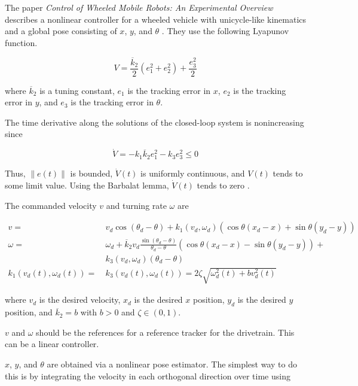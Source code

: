 The paper \textit{Control of Wheeled Mobile Robots: An Experimental Overview}
describes a nonlinear controller for a wheeled vehicle with unicycle-like
kinematics and a global pose consisting of $x$, $y$, and $\theta$
\cite{bib:ctrl-wheeled-mobile-robots}. They use the following Lyapunov function.

\begin{equation*}
  V = \frac{\overline{k}_2}{2}(e_1^2 + e_2^2) + \frac{e_3^2}{2}
\end{equation*}

where $\overline{k}_2$ is a tuning constant, $e_1$ is the tracking error in $x$,
$e_2$ is the tracking error in $y$, and $e_3$ is the tracking error in $\theta$.

The time derivative along the solutions of the closed-loop system is
nonincreasing since

\begin{equation*}
  \dot{V} = -k_1 \overline{k}_2 e_1^2 - k_3 e_3^2 \leq 0
\end{equation*}

Thus, $\lVert e(t) \rVert$ is bounded, $\dot{V}(t)$ is uniformly continuous,
and $V(t)$ tends to some limit value. Using the Barbalat lemma, $\dot{V}(t)$
tends to zero \cite{bib:ctrl-wheeled-mobile-robots}.

The commanded velocity $v$ and turning rate $\omega$ are

\begin{align}
  v =~& v_d \cos(\theta_d - \theta) + k_1(v_d, \omega_d)(\cos\theta(x_d - x) +
    \sin\theta(y_d - y)) \\
  \omega =~& \omega_d +
    \overline{k}_2 v_d\frac{\sin(\theta_d - \theta)}{\theta_d - \theta}
    (\cos\theta(x_d - x) - \sin\theta(y_d - y)) + \nonumber \\
    &k_3 (v_d, \omega_d)(\theta_d - \theta) \\
  k_1(v_d(t), \omega_d(t)) =~& k_3(v_d(t), \omega_d(t)) =
    2\zeta\sqrt{\omega_d^2(t) + bv_d^2(t)}
\end{align}

where $v_d$ is the desired velocity, $x_d$ is the desired $x$ position, $y_d$ is
the desired $y$ position, and $\overline{k}_2 = b$ with $b > 0$ and
$\zeta \in (0, 1)$.

$v$ and $\omega$ should be the references for a reference tracker for the
drivetrain. This can be a linear controller.

$x$, $y$, and $\theta$ are obtained via a nonlinear pose estimator. The simplest
way to do this is by integrating the velocity in each orthogonal direction over
time using

